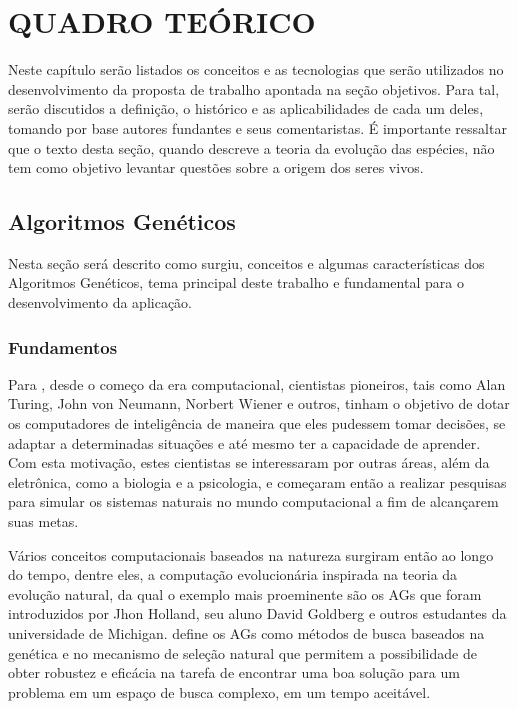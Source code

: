 \chapter{QUADRO TEÓRICO}

\par Neste capítulo serão listados os conceitos e as tecnologias que serão
utilizados no desenvolvimento da proposta de trabalho apontada na seção 
objetivos. Para tal, serão discutidos a definição, o histórico e as 
aplicabilidades de cada um deles, tomando por base autores fundantes e 
seus comentaristas. É importante ressaltar que o texto desta seção, quando
descreve a teoria da evolução das espécies, não tem como objetivo levantar
questões sobre a origem dos seres vivos.

\section{Algoritmos Genéticos}

\par Nesta seção será descrito como surgiu, conceitos e algumas características
dos Algoritmos Genéticos, tema principal deste trabalho e fundamental para o
desenvolvimento da aplicação.

\subsection{Fundamentos}

\par Para , desde o começo da
era computacional, cientistas pioneiros, tais como Alan Turing, John von
Neumann, Norbert Wiener e outros, tinham o objetivo de dotar os computadores de inteligência
de maneira que eles pudessem tomar decisões, se adaptar a determinadas situações
e até mesmo ter a capacidade de aprender. Com esta motivação, estes cientistas
se interessaram por outras áreas, além da eletrônica, como  a
biologia e a psicologia, e começaram então a realizar pesquisas para simular os
sistemas naturais no mundo computacional a fim de alcançarem suas metas. 

\par Vários conceitos computacionais baseados na natureza surgiram então ao
longo do tempo, dentre eles, a computação evolucionária inspirada na teoria da
evolução natural, da qual o exemplo mais proeminente são os AGs que foram
introduzidos por Jhon Holland, seu aluno David Goldberg e outros estudantes da universidade de Michigan.
 define os AGs como métodos de busca baseados na
genética e no mecanismo de seleção natural que permitem a possibilidade de obter
robustez e eficácia na tarefa de encontrar uma boa solução para um problema
em um espaço de busca complexo, em um tempo aceitável.


